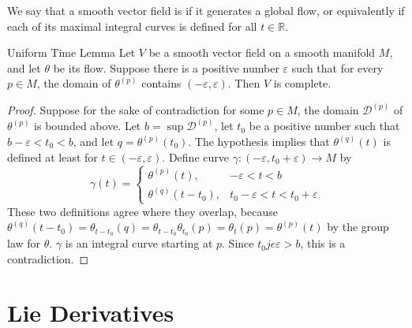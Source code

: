 \documentclass[../main.tex]{subfiles}
\begin{document}
\begin{definition}{}{}
    We say that a smooth vector field is  if it generates a global flow, or equivalently if each of its maximal integral curves is defined for all \(t \in \mathbb{R}\).
\end{definition}

\begin{lemma}{Uniform Time Lemma}{}
 Let $V$ be a smooth vector field on a smooth manifold $M$, and let $\theta$ be its flow. Suppose there is a positive number $\varepsilon$ such that for every $p \in M$, the domain of $\theta^{(p)}$ contains $(-\varepsilon,\varepsilon)$. Then $V$ is complete.
\end{lemma}

\begin{proof}
    Suppose for the sake of contradiction for some \(  p \in M  \), the domain \(  \mathcal{D}^{\left( p \right) }  \) of \(   \theta ^{\left( p \right) }  \) is bounded above. Let \(  b= \sup \mathcal{D}^{\left( p \right) }  \), let \(  t_0  \) be a positive number such that \(  b- \varepsilon < t_0< b  \), and let \(  q=  \theta ^{\left( p \right) }\left( t_0 \right)   \). The hypothesis implies that \(   \theta ^{\left( q \right) }\left( t \right)   \) is defined at least for \(  t\in \left( - \varepsilon , \varepsilon  \right)   \). Define curve \(   \gamma :\left( - \varepsilon ,t_0+  \varepsilon  \right)   \to M\) by \[
     \gamma \left( t \right)= \begin{cases}  \theta ^{\left( p \right) }\left( t \right),& - \varepsilon < t< b\\ 
       \theta ^{\left( q \right) }\left( t-t_0 \right),& t_0- \varepsilon < t< t_0+  \varepsilon    \end{cases}  
    \]         These two definitions agree where they overlap,  because \(   \theta ^{\left( q \right) }\left( t-t_0 \right)=  \theta _{t-t_0}\left( q \right)=  \theta _{t-t_0} \theta _{t_0}\left( p \right)=  \theta _{t}\left( p \right)=  \theta ^{\left( p \right) }\left( t \right)        \) by the group law for \(   \theta   \).   \(   \gamma   \) is an integral curve starting at \(  p  \). Since \(  t_0je \varepsilon > b  \), this is a contradiction.   
\end{proof}

\section{Lie Derivatives}
\end{document}
